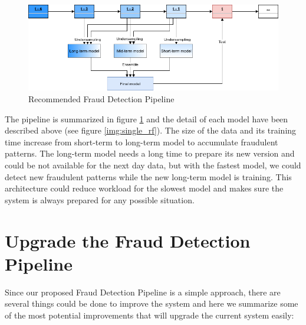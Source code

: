 \begin{figure}
\centering
\includegraphics[width=\textwidth]{Images/FDS_diagram.png}
\caption{Recommended Fraud Detection Pipeline}
\label{img:fraud_detection_pipeline}
\end{figure}


The pipeline is summarized in figure \ref{img:fraud_detection_pipeline} and the detail of each model have been described above (see figure \ref{img:single_rf}). The size of the data and its training time increase from short-term to long-term model to accumulate fraudulent patterns. The long-term model needs a long time to prepare its new version and could be not available for the next day data, but with the fastest model, we could detect new fraudulent patterns while the new long-term model is training. This architecture could reduce workload for the slowest model and makes sure the system is always prepared for any possible situation.


\section{Upgrade the Fraud Detection Pipeline}

Since our proposed Fraud Detection Pipeline is a simple approach, there are several things could be done to improve the system and here we summarize some of the most potential improvements that will upgrade the current system easily:

